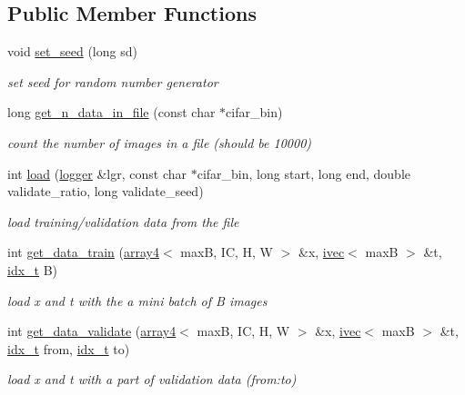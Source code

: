 \subsection*{Public Member Functions}
\begin{DoxyCompactItemize}
\item 
void \hyperlink{structcifar10__dataset_a90bb8f4e440939589db017dbc89004c4}{set\+\_\+seed} (long sd)
\begin{DoxyCompactList}\small\item\em set seed for random number generator \end{DoxyCompactList}\item 
long \hyperlink{structcifar10__dataset_ad0025b0632ecfa9810d8a7c99d279f51}{get\+\_\+n\+\_\+data\+\_\+in\+\_\+file} (const char $\ast$cifar\+\_\+bin)
\begin{DoxyCompactList}\small\item\em count the number of images in a file (should be 10000) \end{DoxyCompactList}\item 
int \hyperlink{structcifar10__dataset_a1da02b1a5b0f6a6dbc917253d7fc960b}{load} (\hyperlink{structlogger}{logger} \&lgr, const char $\ast$cifar\+\_\+bin, long start, long end, double validate\+\_\+ratio, long validate\+\_\+seed)
\begin{DoxyCompactList}\small\item\em load training/validation data from the file \end{DoxyCompactList}\item 
int \hyperlink{structcifar10__dataset_afafc5833390f1f3f9c2fefea15d643ca}{get\+\_\+data\+\_\+train} (\hyperlink{structarray4}{array4}$<$ maxB, IC, H, W $>$ \&x, \hyperlink{structivec}{ivec}$<$ maxB $>$ \&t, \hyperlink{vgg__util_8h_a8e93478a00e685bea5e6a3f617bf03a3}{idx\+\_\+t} B)
\begin{DoxyCompactList}\small\item\em load x and t with the a mini batch of B images \end{DoxyCompactList}\item 
int \hyperlink{structcifar10__dataset_a4176a67684d105dac1c95a1556761173}{get\+\_\+data\+\_\+validate} (\hyperlink{structarray4}{array4}$<$ maxB, IC, H, W $>$ \&x, \hyperlink{structivec}{ivec}$<$ maxB $>$ \&t, \hyperlink{vgg__util_8h_a8e93478a00e685bea5e6a3f617bf03a3}{idx\+\_\+t} from, \hyperlink{vgg__util_8h_a8e93478a00e685bea5e6a3f617bf03a3}{idx\+\_\+t} to)
\begin{DoxyCompactList}\small\item\em load x and t with a part of validation data (from\+:to) \end{DoxyCompactList}\end{DoxyCompactItemize}
